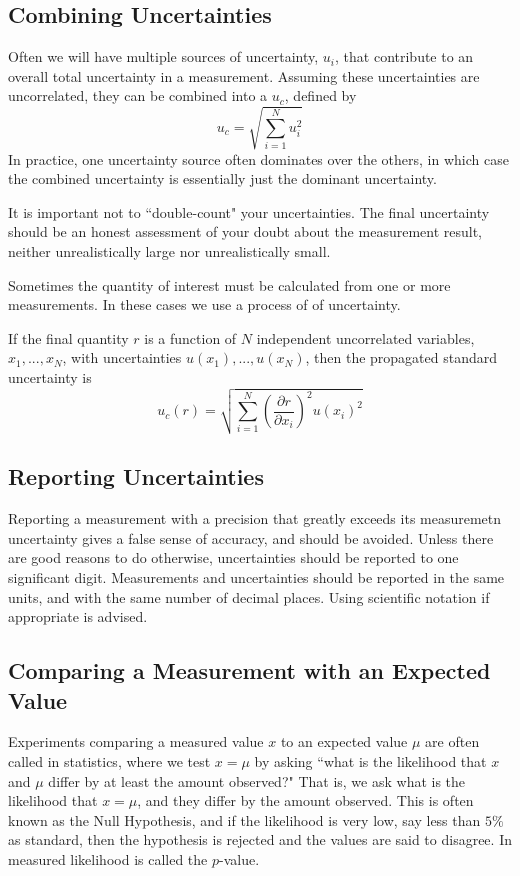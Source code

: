 \subsection{Combining Uncertainties}

Often we will have multiple sources of uncertainty, $u_i$, that contribute to an overall total uncertainty in a measurement. Assuming these uncertainties are uncorrelated, they can be combined into a  $u_c$, defined by $$u_c = \sqrt{\sum_{i=1}^Nu_i^2}$$
In practice, one uncertainty source often dominates over the others, in which case the combined uncertainty is essentially just the dominant uncertainty.

It is important not to ``double-count" your uncertainties. The final uncertainty should be an honest assessment of your doubt about the measurement result, neither unrealistically large nor unrealistically small.

Sometimes the quantity of interest must be calculated from one or more measurements. In these cases we use a process of  of uncertainty.

\begin{defn}
    If the final quantity $r$ is a function of $N$ independent uncorrelated variables, $x_1,...,x_N$, with uncertainties $u(x_1),...,u(x_N)$, then the propagated standard uncertainty is $$u_c(r) = \sqrt{\sum_{i=1}^N\left(\frac{\partial r}{\partial x_i}\right)^2u(x_i)^2}$$
\end{defn}

\subsection{Reporting Uncertainties}

Reporting a measurement with a precision that greatly exceeds its measuremetn uncertainty gives a false sense of accuracy, and should be avoided. Unless there are good reasons to do otherwise, uncertainties should be reported to one significant digit. Measurements and uncertainties should be reported in the same units, and with the same number of decimal places. Using scientific notation if appropriate is advised.

\subsection{Comparing a Measurement with an Expected Value}

Experiments comparing a measured value $x$ to an expected value $\mu$ are often called  in statistics, where we test $x = \mu$ by asking ``what is the likelihood that $x$ and $\mu$ differ by at least the amount observed?" That is, we ask what is the likelihood that $x = \mu$, and they differ by the amount observed. This is often known as the Null Hypothesis, and if the likelihood is very low, say less than $5\%$ as standard, then the hypothesis is rejected and the values are said to disagree. In measured likelihood is called the $p$-value.

